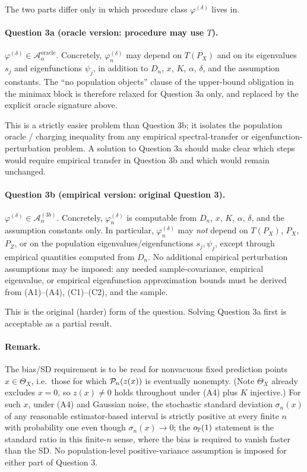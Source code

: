 \documentclass{article}
\begin{document}
The two parts differ only in which procedure class
\(\varphi^{(\delta)}\) lives in.

\paragraph{Question 3a (oracle version: procedure may use \(T\)).}
\(\varphi^{(\delta)}\in\mathcal A_\alpha^{\mathrm{oracle}}\). Concretely,
\(\varphi_n^{(\delta)}\) may depend on \(T(P_X)\) and on its eigenvalues
\(s_j\) and eigenfunctions \(\psi_j\), in addition to \(D_n\), \(x\),
\(K\), \(\alpha\), \(\delta\), and the assumption constants. The ``no
population objects'' clause of the upper-bound obligation in the
minimax block is therefore relaxed for Question 3a only, and replaced
by the explicit oracle signature above.

This is a strictly easier problem than Question 3b; it isolates the
population oracle / charging inequality from any empirical
spectral-transfer or eigenfunction-perturbation problem. A solution to
Question 3a should make clear which steps would require empirical
transfer in Question 3b and which would remain unchanged.

\paragraph{Question 3b (empirical version: original Question 3).}
\(\varphi^{(\delta)}\in\mathcal A_\alpha^{(3b)}\). Concretely,
\(\varphi_n^{(\delta)}\) is computable from \(D_n\), \(x\), \(K\),
\(\alpha\), \(\delta\), and the assumption constants only. In
particular, \(\varphi_n^{(\delta)}\) may \emph{not} depend on
\(T(P_X)\), \(P_X\), \(P_Z\), or on the population
eigenvalues/eigenfunctions \(s_j,\psi_j\), except through empirical
quantities computed from \(D_n\). No additional empirical perturbation
assumptions may be imposed: any needed sample-covariance, empirical
eigenvalue, or empirical eigenfunction approximation bounds must be
derived from (A1)--(A4), (C1)--(C2), and the sample.

This is the original (harder) form of the question. Solving Question
3a first is acceptable as a partial result.

\paragraph{Remark.}
The bias/SD requirement is to be read for nonvacuous fixed prediction
points \(x\in\Theta_X\), i.e.\ those for which \(\mathcal P_n(z(x))\) is
eventually nonempty. (Note \(\Theta_X\) already excludes \(x=0\), so
\(z(x)\neq 0\) holds throughout under (A4) plus \(K\) injective.) For
such \(x\), under (A4) and Gaussian noise, the stochastic standard
deviation \(\sigma_n(x)\) of any reasonable estimator-based interval
is strictly positive at every finite \(n\) with probability one even
though \(\sigma_n(x)\to 0\); the \(o_{\mathbb{P}}(1)\) statement is the
standard ratio in this finite-\(n\) sense, where the bias is required
to vanish faster than the SD. No population-level positive-variance
assumption is imposed for either part of Question 3.
\end{document}
